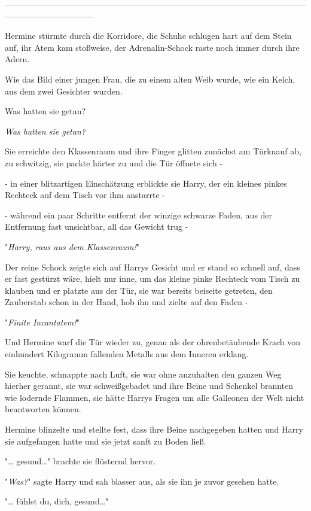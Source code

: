{--------------------------------------------------------------------------------------------------------------------------------------------

Hermine stürmte durch die Korridore, die Schuhe schlugen hart auf dem Stein auf, ihr Atem kam stoßweise, der Adrenalin-Schock raste noch immer durch ihre Adern.

Wie das Bild einer jungen Frau, die zu einem alten Weib wurde, wie ein Kelch, aus dem zwei Gesichter wurden.

Was hatten sie getan?

\emph{Was hatten sie getan?}

Sie erreichte den Klassenraum und ihre Finger glitten zunächst am Türknauf ab, zu schwitzig, sie packte härter zu und die Tür öffnete sich -

- in einer blitzartigen Einschätzung erblickte sie Harry, der ein kleines pinkes Rechteck auf dem Tisch vor ihm anstarrte -

- während ein paar Schritte entfernt der winzige schwarze Faden, aus der Entfernung fast unsichtbar, all das Gewicht trug -

"\emph{Harry, raus aus dem Klassenraum!}"

Der reine Schock zeigte sich auf Harrys Gesicht und er stand so schnell auf, dass er fast gestürzt wäre, hielt nur inne, um das kleine pinke Rechteck vom Tisch zu klauben und er platzte aus der Tür, sie war bereits beiseite getreten, den Zauberstab schon in der Hand, hob ihn und zielte auf den Faden -

"\emph{Finite Incantatem!}"

Und Hermine warf die Tür wieder zu, genau als der ohrenbetäubende Krach von einhundert Kilogramm fallenden Metalls aus dem Inneren erklang.

Sie keuchte, schnappte nach Luft, sie war ohne anzuhalten den ganzen Weg hierher gerannt, sie war schweißgebadet und ihre Beine und Schenkel brannten wie lodernde Flammen, sie hätte Harrys Fragen um alle Galleonen der Welt nicht beantworten können.

Hermine blinzelte und stellte fest, dass ihre Beine nachgegeben hatten und Harry sie aufgefangen hatte und sie jetzt sanft zu Boden ließ.

"… gesund…" brachte sie flüsternd hervor.

"\emph{Was?}" sagte Harry und sah blasser aus, als sie ihn je zuvor gesehen hatte.

"… fühlst du, dich, gesund…"

}
